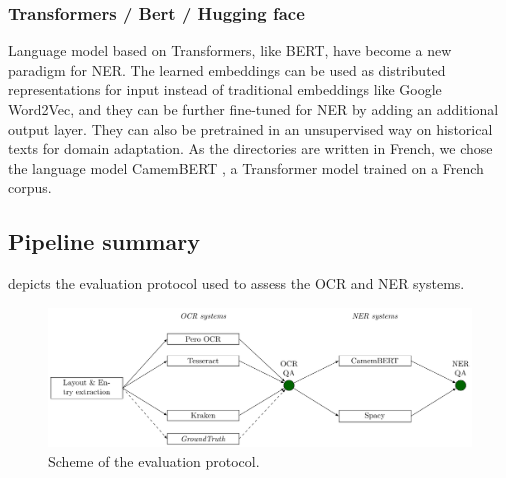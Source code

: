 


\subsubsection{Transformers / Bert / Hugging face}
Language model based on Transformers, like BERT, have become a new paradigm for NER\cite{li2020}. 
The learned embeddings can be used as distributed representations for input instead of traditional embeddings like Google Word2Vec, and they can be further fine-tuned for NER by adding an additional output layer. 
They can also be pretrained in an unsupervised way on historical texts for domain adaptation.
As the directories are written in French, we chose the language model CamemBERT \cite{martin-etal-2020-camembert}, a Transformer model trained on a French corpus.

\subsection{Pipeline summary}

 depicts the evaluation protocol used to assess the OCR and NER systems. 

\begin{figure}[tb]
    \includegraphics[width=\linewidth]{figs/protocol.pdf}
    \caption{Scheme of the evaluation protocol. }
    \label{fig.protocol}
    \end{figure}


